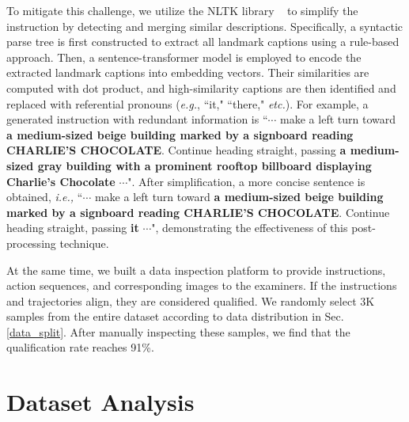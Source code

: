 To mitigate this challenge, we utilize the NLTK library ~\cite{bird2006nltk} to simplify the instruction by detecting and merging similar descriptions. Specifically, a syntactic parse tree is first constructed to extract all landmark captions using a rule-based approach. Then, a sentence-transformer model is employed to encode the extracted landmark captions into embedding vectors. Their similarities are computed with dot product, and high-similarity captions are then identified and replaced with referential pronouns (\emph{e.g.}, ``it," ``there," \emph{etc.}). For example, a generated instruction with redundant information is ``$\cdots$ make a left turn toward \textbf{a medium-sized beige building marked by a signboard reading CHARLIE'S CHOCOLATE}. Continue heading straight, passing \textbf{a medium-sized gray building with a prominent rooftop billboard displaying Charlie’s Chocolate} $\cdots$". After simplification, a more concise sentence is obtained, \emph{i.e.,} ``$\cdots$ make a left turn toward \textbf{a medium-sized beige building marked by a signboard reading CHARLIE'S CHOCOLATE}. Continue heading straight, passing \textbf{it} $\cdots$", demonstrating the effectiveness of this post-processing technique. 

At the same time, we built a data inspection platform to provide instructions, action sequences, and corresponding images to the examiners. If the instructions and trajectories align, they are considered qualified. We randomly select 3K samples from the entire dataset  according to data distribution in Sec. \ref{data_split}. After manually inspecting these samples, we find that the qualification rate reaches 91\%.





\section{Dataset Analysis}

